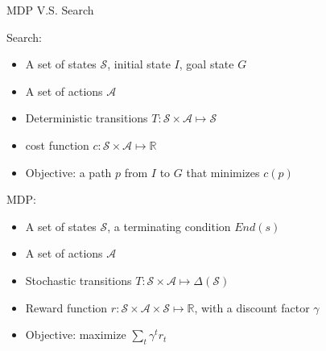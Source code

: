 \documentclass{beamer}
\begin{document}
\begin{frame}{MDP V.S. Search}
    \begin{exampleblock}{Search:}
        \begin{itemize}
            \item A set of states $\mathcal{S}$, initial state $I$, goal state $G$

            \item A set of actions $\mathcal{A}$

            \item Deterministic transitions $T: \mathcal{S} \times \mathcal{A} \mapsto \mathcal{S}$

            \item cost function $c: \mathcal{S} \times \mathcal{A} \mapsto \mathbb{R}$

            \item Objective: a path $p$ from $I$ to $G$ that minimizes $c(p)$
        \end{itemize}
    \end{exampleblock}

    \pause
    \vspace{-3mm}
    \begin{exampleblock}{MDP:}
        \begin{itemize}
            \item A set of states $\mathcal{S}$, a terminating condition $End(s)$

            \item A set of actions $\mathcal{A}$

            \item Stochastic transitions $T: \mathcal{S} \times \mathcal{A} \mapsto \Delta(\mathcal{S})$

            \item Reward function $r: \mathcal{S} \times \mathcal{A} \times \mathcal{S} \mapsto \mathbb{R}$, with a discount factor $\gamma$

            \item Objective: maximize $\sum_t \gamma^t r_t$
        \end{itemize}
    \end{exampleblock}
\end{frame}
\end{document}
